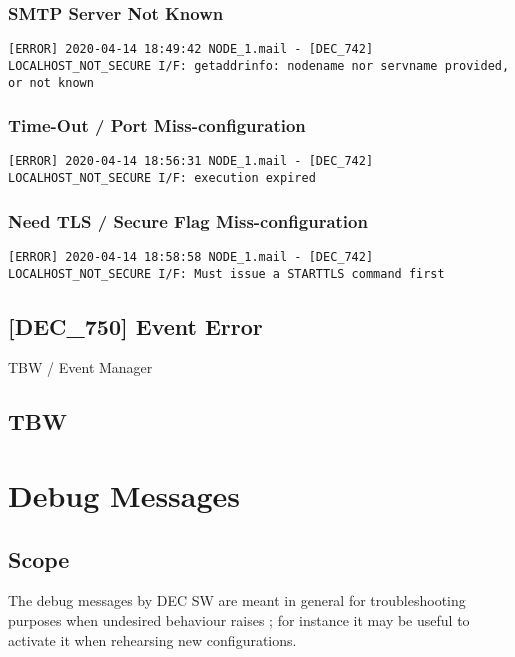 \documentclass[dec_sum_main.tex]{subfiles}
\begin{document}
\subsubsection{SMTP Server Not Known}

\begin{verbatim}
[ERROR] 2020-04-14 18:49:42 NODE_1.mail - [DEC_742] LOCALHOST_NOT_SECURE I/F: getaddrinfo: nodename nor servname provided, or not known
\end{verbatim}

\subsubsection{Time-Out / Port Miss-configuration}
\begin{verbatim}
[ERROR] 2020-04-14 18:56:31 NODE_1.mail - [DEC_742] LOCALHOST_NOT_SECURE I/F: execution expired
\end{verbatim}

\subsubsection{Need TLS / Secure Flag Miss-configuration}
\begin{verbatim}
[ERROR] 2020-04-14 18:58:58 NODE_1.mail - [DEC_742] LOCALHOST_NOT_SECURE I/F: Must issue a STARTTLS command first
\end{verbatim}

\label{DEC750}
\subsection{[DEC\_750] Event Error}
TBW / Event Manager

\subsection{TBW}


\newpage
\section{Debug Messages}

\subsection{Scope}
The debug messages by DEC SW are meant in general for troubleshooting purposes when undesired behaviour raises ; for instance it may be useful to activate it when rehearsing new configurations. \newline
\end{document}
